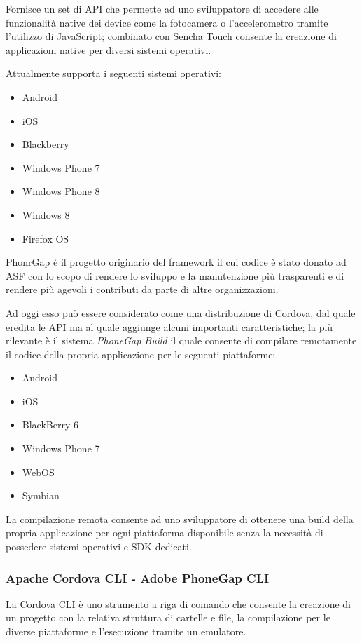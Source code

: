 Fornisce un set di \ac{API} che permette ad uno sviluppatore di accedere alle funzionalità native dei device come la fotocamera o l'accelerometro tramite l'utilizzo di JavaScript; combinato con Sencha Touch consente la creazione di applicazioni native per diversi sistemi operativi.

Attualmente supporta i seguenti sistemi operativi:
\begin{itemize}
\item Android
\item iOS
\item Blackberry
\item Windows Phone 7
\item Windows Phone 8
\item Windows 8
\item Firefox OS
\end{itemize}

PhonrGap è il progetto originario del framework il cui codice è stato donato ad \ac{ASF} con lo scopo di rendere lo sviluppo e la manutenzione più trasparenti e di rendere più agevoli i contributi da parte di altre organizzazioni.

Ad oggi esso può essere considerato come una distribuzione di Cordova, dal quale eredita le \ac{API} ma al quale aggiunge alcuni importanti caratteristiche; la più rilevante è il sistema \emph{PhoneGap Build} il quale consente di compilare remotamente il codice della propria applicazione per le seguenti piattaforme:
\begin{itemize}
\item Android
\item iOS
\item BlackBerry 6
\item Windows Phone 7
\item WebOS
\item Symbian
\end{itemize}
La compilazione remota consente ad uno sviluppatore di ottenere una build della propria applicazione per ogni piattaforma disponibile senza la necessità di possedere sistemi operativi e \ac{SDK} dedicati.

\subsubsection{Apache Cordova CLI - Adobe PhoneGap CLI}
La Cordova \ac{CLI} è uno strumento a riga di comando che consente la creazione di un progetto con la relativa struttura di cartelle e file, la compilazione per le diverse piattaforme e l'esecuzione tramite un emulatore.

